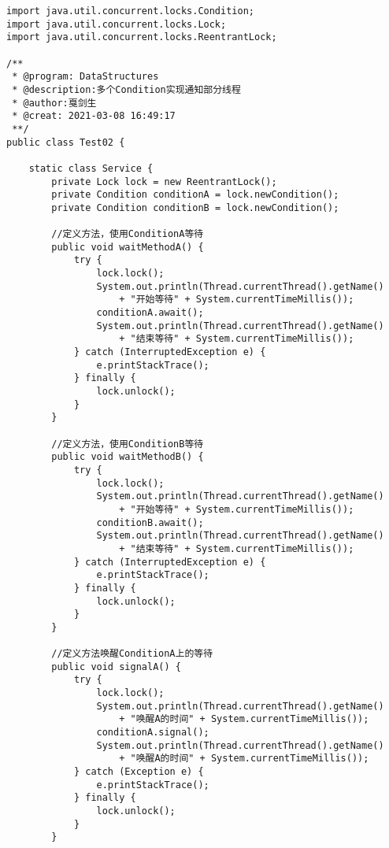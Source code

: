 \documentclass[a4paper]{report}
\begin{document}
\begin{Verbatim}[frame=single,numbersep=5pt,xleftmargin=1.5em,xrightmargin=1.5em]
import java.util.concurrent.locks.Condition;
import java.util.concurrent.locks.Lock;
import java.util.concurrent.locks.ReentrantLock;

/**
 * @program: DataStructures
 * @description:多个Condition实现通知部分线程
 * @author:戛剑生
 * @creat: 2021-03-08 16:49:17
 **/
public class Test02 {

    static class Service {
        private Lock lock = new ReentrantLock();
        private Condition conditionA = lock.newCondition();
        private Condition conditionB = lock.newCondition();

        //定义方法，使用ConditionA等待
        public void waitMethodA() {
            try {
                lock.lock();
                System.out.println(Thread.currentThread().getName()
                    + "开始等待" + System.currentTimeMillis());
                conditionA.await();
                System.out.println(Thread.currentThread().getName()
                    + "结束等待" + System.currentTimeMillis());
            } catch (InterruptedException e) {
                e.printStackTrace();
            } finally {
                lock.unlock();
            }
        }

        //定义方法，使用ConditionB等待
        public void waitMethodB() {
            try {
                lock.lock();
                System.out.println(Thread.currentThread().getName()
                    + "开始等待" + System.currentTimeMillis());
                conditionB.await();
                System.out.println(Thread.currentThread().getName()
                    + "结束等待" + System.currentTimeMillis());
            } catch (InterruptedException e) {
                e.printStackTrace();
            } finally {
                lock.unlock();
            }
        }

        //定义方法唤醒ConditionA上的等待
        public void signalA() {
            try {
                lock.lock();
                System.out.println(Thread.currentThread().getName()
                    + "唤醒A的时间" + System.currentTimeMillis());
                conditionA.signal();
                System.out.println(Thread.currentThread().getName()
                    + "唤醒A的时间" + System.currentTimeMillis());
            } catch (Exception e) {
                e.printStackTrace();
            } finally {
                lock.unlock();
            }
        }


\end{Verbatim}
\end{document}
